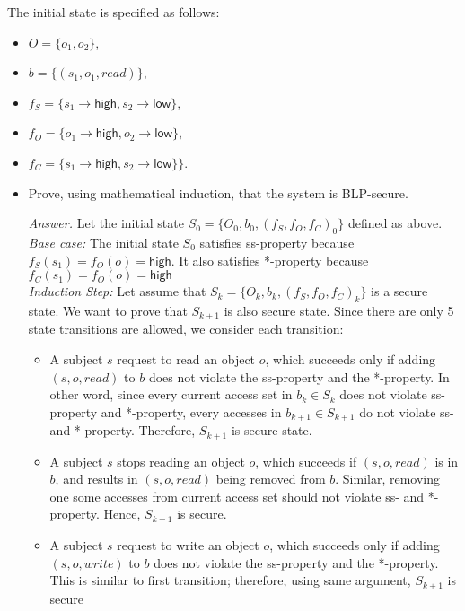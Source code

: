 \documentclass[11pt]{article}
\newcommand{\rea}{read}
\newcommand{\wri}{write}
\begin{document}
\begin{description}
The initial state is specified as follows:
\begin{itemize}
 \item
$O=\{o_1, o_2\}$,
 \item
$b=\{(s_1, o_1, \rea)\}$,

 \item
$f_S=\{s_1\rightarrow \mathsf{high}, s_2\rightarrow \mathsf{low}\}$,

 \item
$f_O=\{o_1\rightarrow \mathsf{high}, o_2\rightarrow \mathsf{low}\}$,

 \item
$f_C=\{s_1\rightarrow \mathsf{high}, s_2\rightarrow \mathsf{low}\}\}$.
\end{itemize}

{\bf
\begin{itemize}
 \item
Prove, using mathematical induction, that the system is BLP-secure.
\begin{mdframed}
	\textit{Answer. } Let the initial state $S_0 = \{O_0, b_0, (f_S,f_O,f_C)_0\}$ defined as above.
	\\\textit{Base case:} The initial state $S_0$ satisfies ss-property because $f_S(s_1)=f_O(o)=\mathsf{high}$. It also satisfies *-property because $f_C(s_1)=f_O(o)=\mathsf{high}$ 
	\\\textit{Induction Step:} Let assume that $S_k= \{O_k, b_k, (f_S,f_O,f_C)_k\}$ is a secure state. We want to prove that $S_{k+1}$ is also secure state. Since there are only 5 state transitions are allowed, we consider each transition: 
	\begin{itemize}
		\item A subject $s$ request to read an object $o$, which succeeds only if adding $(s,o,\rea)$ to $b$ does not violate the ss-property and the *-property. In other word, since every current access set in $b_k \in S_k$ does not violate ss-property and *-property, every accesses in $b_{k+1} \in S_{k+1}$ do not violate ss- and *-property. Therefore, $S_{k+1}$ is secure state.

		\item A subject $s$ stops reading an object $o$, which succeeds if $(s,o,\rea)$ is in $b$, and results in $(s,o,\rea)$ being removed from $b$. Similar, removing one some accesses from current access set should not violate ss- and *-property. Hence, $S_{k+1}$ is secure.

		\item
		A subject $s$ request to write an object $o$, which succeeds only if adding
		$(s,o,\wri)$ to $b$ does not violate the ss-property and the *-property. This is similar to first transition; therefore, using same argument, $S_{k+1}$ is secure


\end{itemize}
\end{mdframed}
\end{itemize}}
\end{description}
\end{document}

